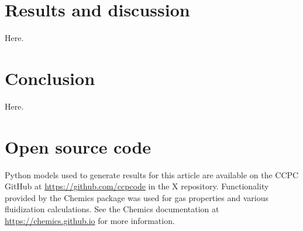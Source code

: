 \documentclass{article}
\begin{document}
\section{Results and discussion}

Here.

\section{Conclusion}

Here.

\section{Open source code}

Python models used to generate results for this article are available on the CCPC GitHub at \url{https://github.com/ccpcode} in the X repository. Functionality provided by the Chemics package was used for gas properties and various fluidization calculations. See the Chemics documentation at \url{https://chemics.github.io} for more information.

\printbibliography
\end{document}
